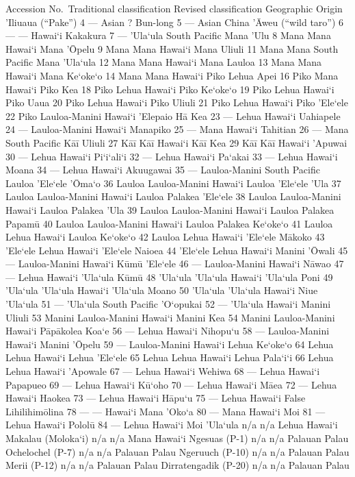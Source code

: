 \documentclass[
]{article}
\begin{document}
Accession No.~Traditional classification Revised classification
Geographic Origin 'Iliuaua (``Pake'') 4 --- Asian ? Bun-long 5 --- Asian
China 'Āweu (``wild taro'') 6 --- --- Hawai`i Kakakura 7 --- 'Ula`ula
South Pacific Mana 'Ulu 8 Mana Mana Hawai`i Mana 'Ōpelu 9 Mana Mana
Hawai`i Mana Uliuli 11 Mana Mana South Pacific Mana 'Ula`ula 12 Mana
Mana Hawai`i Mana Lauloa 13 Mana Mana Hawai`i Mana Ke`oke`o 14 Mana Mana
Hawai`i Piko Lehua Apei 16 Piko Mana Hawai`i Piko Kea 18 Piko Lehua
Hawai`i Piko Ke`oke`o 19 Piko Lehua Hawai`i Piko Uaua 20 Piko Lehua
Hawai`i Piko Uliuli 21 Piko Lehua Hawai`i Piko 'Ele`ele 22 Piko
Lauloa-Manini Hawai`i 'Elepaio Hā Kea 23 --- Lehua Hawai`i Uahiapele 24
--- Lauloa-Manini Hawai`i Manapiko 25 --- Mana Hawai`i Tahitian 26 ---
Mana South Pacific Kāī Uliuli 27 Kāī Kāī Hawai`i Kāī Kea 29 Kāī Kāī
Hawai`i 'Apuwai 30 --- Lehua Hawai`i Pi`i`ali`i 32 --- Lehua Hawai`i
Pa`akai 33 --- Lehua Hawai`i Moana 34 --- Lehua Hawai`i Akuugawai 35 ---
Lauloa-Manini South Pacific Lauloa 'Ele`ele 'Ōma`o 36 Lauloa
Lauloa-Manini Hawai`i Lauloa 'Ele`ele 'Ula 37 Lauloa Lauloa-Manini
Hawai`i Lauloa Palakea 'Ele`ele 38 Lauloa Lauloa-Manini Hawai`i Lauloa
Palakea 'Ula 39 Lauloa Lauloa-Manini Hawai`i Lauloa Palakea Papamū 40
Lauloa Lauloa-Manini Hawai`i Lauloa Palakea Ke`oke`o 41 Lauloa Lehua
Hawai`i Lauloa Ke`oke`o 42 Lauloa Lehua Hawai`i 'Ele`ele Mākoko 43
'Ele`ele Lehua Hawai`i 'Ele`ele Naioea 44 'Ele`ele Lehua Hawai`i Manini
'Ōwali 45 --- Lauloa-Manini Hawai`i Kūmū 'Ele`ele 46 --- Lauloa-Manini
Hawai`i Nāwao 47 --- Lehua Hawai`i 'Ula`ula Kūmū 48 'Ula`ula 'Ula`ula
Hawai`i 'Ula`ula Poni 49 'Ula`ula 'Ula`ula Hawai`i 'Ula`ula Moano 50
'Ula`ula 'Ula`ula Hawai`i Niue 'Ula`ula 51 --- 'Ula`ula South Pacific
'O`opukai 52 --- 'Ula`ula Hawai`i Manini Uliuli 53 Manini Lauloa-Manini
Hawai`i Manini Kea 54 Manini Lauloa-Manini Hawai`i Pāpākolea Koa`e 56
--- Lehua Hawai`i Nihopu`u 58 --- Lauloa-Manini Hawai`i Manini 'Ōpelu 59
--- Lauloa-Manini Hawai`i Lehua Ke`oke`o 64 Lehua Lehua Hawai`i Lehua
'Ele`ele 65 Lehua Lehua Hawai`i Lehua Pala`i`i 66 Lehua Lehua Hawai`i
'Apowale 67 --- Lehua Hawai`i Wehiwa 68 --- Lehua Hawai`i Papapueo 69
--- Lehua Hawai`i Kū`oho 70 --- Lehua Hawai`i Māea 72 --- Lehua Hawai`i
Haokea 73 --- Lehua Hawai`i Hāpu`u 75 --- Lehua Hawai`i False
Lihilihimōlina 78 --- --- Hawai`i Mana 'Oko`a 80 --- Mana Hawai`i Moi 81
--- Lehua Hawai`i Pololū 84 --- Lehua Hawai`i Moi 'Ula`ula n/a n/a Lehua
Hawai`i Makalau (Moloka`i) n/a n/a Mana Hawai`i Ngesuas (P-1) n/a n/a
Palauan Palau Ochelochel (P-7) n/a n/a Palauan Palau Ngeruuch (P-10) n/a
n/a Palauan Palau Merii (P-12) n/a n/a Palauan Palau Dirratengadik
(P-20) n/a n/a Palauan Palau
\end{document}
